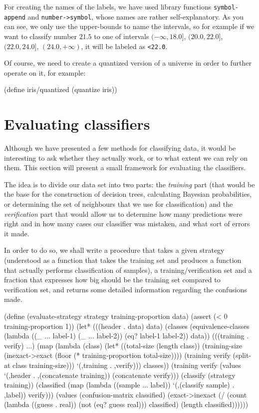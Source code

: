 For creating the names of the labels, we have used library
functions \texttt{symbol-append} and \texttt{number->symbol},
whose names are rather self-explanatory. As you can see,
we only use the upper-bounds to name the intervals, so for
example if we want to classify number $21.5$ to one of intervals
 $(-\infty, 18.0]$, $(20.0, 22.0]$, $(22.0, 24.0]$, $(24.0, +\infty)$,
it will be labeled as \texttt{<22.0}.

Of course, we need to create a quantized version of a universe
in order to further operate on it, for example:

\begin{Snippet}
(define iris/quantized (quantize iris))
\end{Snippet}

\section{Evaluating classifiers}

Although we have presented a few methods for classifying data,
it would be interesting to ask whether they actually work, or
to what extent we can rely on them. This section will present
a small framework for evaluating the classifiers.

The idea is to divide our data set into two parts:
the \textit{training} part (that would be the base for the
construction of decision trees, calculating Bayesian probabilities,
or determining the set of neighbours that we use for classification)
and the \textit{verification} part that would allow us to
determine how many predictions were right and in how many cases
our classifier was mistaken, and what sort of errors it made.

In order to do so, we shall write a procedure that takes
a given strategy (understood as a function that takes the
training set and produces a function that actually performs
classification of samples), a training/verification set and
a fraction that expresses how big should be the training set
compared to verification set, and returns some detailed
information regarding the confusions made.

\begin{Snippet}
(define (evaluate-strategy strategy training-proportion data)
  (assert (< 0 training-proportion 1))
  (let* (((header . data) data)
	 (classes (equivalence-classes 
		   (lambda ((_ ... label-1) (_ ... label-2))
		     (eq? label-1 label-2))
		   data))
	 (((training . verify) ...)
	  (map (lambda (class)
		 (let* ((total-size (length class))
			(training-size (inexact->exact 
					(floor (* training-proportion
						  total-size))))
			(training verify (split-at class 
						   training-size)))
		   `(,training . ,verify)))
	       classes))
	 (training verify (values `(,header . ,(concatenate training))
				  (concatenate verify)))
	 (classify (strategy training))
	 (classified (map (lambda ((sample ... label))
			    `(,(classify sample) . ,label))
			  verify)))
    (values
     (confusion-matrix classified)
     (exact->inexact (/ (count (lambda ((guess . real))
				 (not (eq? guess real)))
			       classified)
			(length classified))))))
\end{Snippet}

